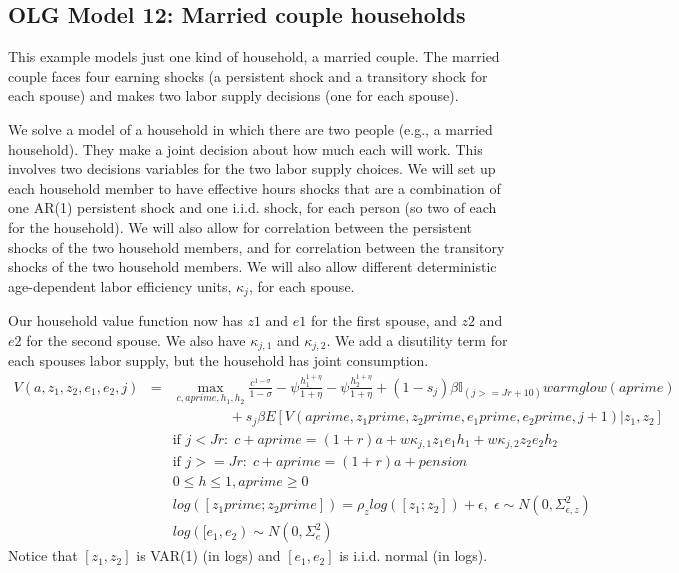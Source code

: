 \subsection{OLG Model 12: Married couple households}
This example models just one kind of household, a married couple. The married couple faces four earning shocks (a persistent shock and a transitory shock for each spouse) and makes two labor supply decisions (one for each spouse).

We solve a model of a household in which there are two people (e.g., a married household). They make a joint decision about how much each will work. This involves two decisions variables for the two labor supply choices. We will set up each household member to have effective hours shocks that are a combination of one AR(1) persistent shock and one i.i.d. shock, for each person (so two of each for the household). We will also allow for correlation between the persistent shocks of the two household members, and for correlation between the transitory shocks of the two household members. We will also allow different deterministic age-dependent labor efficiency units, $\kappa_j$, for each spouse.

Our household value function now has $z1$ and $e1$ for the first spouse, and $z2$ and $e2$ for the second spouse. We also have $\kappa_{j,1}$ and  $\kappa_{j,2}$. We add a disutility term for each spouses labor supply, but the household has joint consumption.
\begin{eqnarray*}
 V(a,z_1,z_2,e_1,e_2,j)&=& \max_{c,aprime,h_1,h_2} \frac{c^{1-\sigma}}{1-\sigma} - \psi \frac{h_1^{1+\eta}}{1+\eta}- \psi \frac{h_2^{1+\eta}}{1+\eta} + (1-s_j)\beta  \mathbb{I}_{(j>=Jr+10)} warmglow(aprime) \\
 && \quad \quad \quad \quad+ s_j \beta E[V(aprime,z_1prime,z_2prime,e_1prime,e_2prime,j+1)|z_1,z_2] \\
&& \text{if }j<Jr: \; c+aprime=(1+r)a+w \kappa_{j,1}  z_1 e_1 h_1+w \kappa_{j,2}  z_2 e_2 h_2 \\
&& \text{if }j>=Jr: \; c+aprime=(1+r)a +pension\\
&& 0\leq h \leq 1, aprime\geq 0 \\
&& log([z_1prime; z_2prime])=\rho_{z} log([z_1; z_2]) + \epsilon, \; \epsilon \sim N(0,\Sigma_{\epsilon,z}^2) \\
&& log([e_1,e_2) \sim N(0,\Sigma_{e}^2)
\end{eqnarray*}
Notice that $[z_1,z_2]$ is VAR(1) (in logs) and $[e_1,e_2]$ is i.i.d. normal (in logs).

